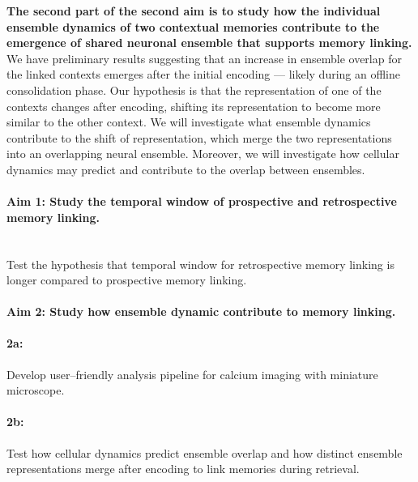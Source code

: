 \documentclass[master.tex]{subfiles}
\begin{document}
\textbf{The second part of the second aim is to study how the individual
  ensemble dynamics of two contextual memories contribute to the emergence of
  shared neuronal ensemble that supports memory linking.} We have preliminary
results suggesting that an increase in ensemble overlap for the linked contexts
emerges after the initial encoding --- likely during an offline consolidation
phase. Our hypothesis is that the representation of one of the contexts changes
after encoding, shifting its representation to become more similar to the other
context. We will investigate what ensemble dynamics contribute to the shift of
representation, which merge the two representations into an overlapping neural
ensemble. Moreover, we will investigate how cellular dynamics may predict and
contribute to the overlap between ensembles.

\paragraph{Aim 1: Study the temporal window of prospective and retrospective
  memory linking.}\mbox{}\\
Test the hypothesis that temporal window for retrospective memory linking is
longer compared to prospective memory linking.

\paragraph{Aim 2: Study how ensemble dynamic contribute to memory linking.}

\paragraph{2a:}Develop user--friendly analysis pipeline for calcium imaging with
miniature microscope.

\paragraph{2b:}Test how cellular dynamics predict ensemble overlap and how
distinct ensemble representations merge after encoding to link memories during
retrieval.

\newpage
\end{document}
